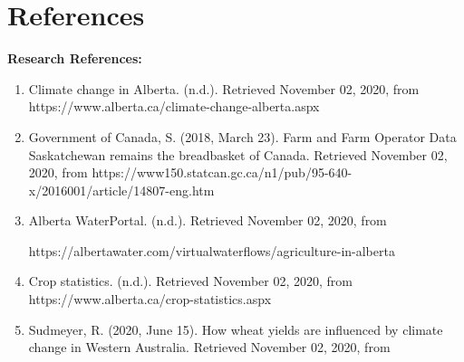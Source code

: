 \documentclass[fontsize=11pt]{article}
\begin{document}
\section*{References}
\textbf{Research References:}\\
\begin{enumerate}
    \item Climate change in Alberta. (n.d.). Retrieved November 02, 2020, from https://www.alberta.ca/climate-change-alberta.aspx
    \item Government of Canada, S. (2018, March 23). Farm and Farm Operator Data Saskatchewan remains the breadbasket of Canada. Retrieved November 02, 2020, from https://www150.statcan.gc.ca/n1/pub/95-640-x/2016001/article/14807-eng.htm
    \item Alberta WaterPortal. (n.d.). Retrieved November 02, 2020, from
    
    https://albertawater.com/virtualwaterflows/agriculture-in-alberta
    \item Crop statistics. (n.d.). Retrieved November 02, 2020, from https://www.alberta.ca/crop-statistics.aspx
    \item Sudmeyer, R. (2020, June 15). How wheat yields are influenced by climate change in Western Australia. Retrieved November 02, 2020, from
    

\end{enumerate}
\end{document}
